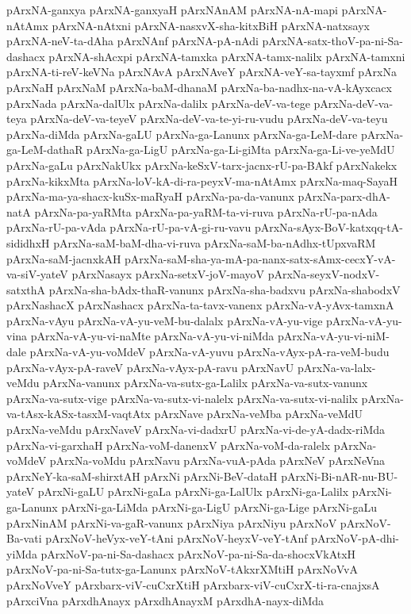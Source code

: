 {pArxNA-ganxya
pArxNA-ganxyaH
pArxNAnAM
pArxNA-nA-mapi
pArxNA-nAtAmx
pArxNA-nAtxni
pArxNA-nasxvX-sha-kitxBiH
pArxNA-natxsayx
pArxNA-neV-ta-dAha
pArxNAnf
pArxNA-pA-nAdi
pArxNA-satx-thoV-pa-ni-Sa-dashacx
pArxNA-shAcxpi
pArxNA-tamxka
pArxNA-tamx-nalilx
pArxNA-tamxni
pArxNA-ti-reV-keVNa
pArxNAvA
pArxNAveY
pArxNA-veY-sa-tayxmf
pArxNa
pArxNaH
pArxNaM
pArxNa-baM-dhanaM
pArxNa-ba-nadhx-na-vA-kAyxcacx
pArxNada
pArxNa-dalUlx
pArxNa-dalilx
pArxNa-deV-va-tege
pArxNa-deV-va-teya
pArxNa-deV-va-teyeV
pArxNa-deV-va-te-yi-ru-vudu
pArxNa-deV-va-teyu
pArxNa-diMda
pArxNa-gaLU
pArxNa-ga-Lanunx
pArxNa-ga-LeM-dare
pArxNa-ga-LeM-dathaR
pArxNa-ga-LigU
pArxNa-ga-Li-giMta
pArxNa-ga-Li-ve-yeMdU
pArxNa-gaLu
pArxNakUkx
pArxNa-keSxV-tarx-jacnx-rU-pa-BAkf
pArxNakekx
pArxNa-kikxMta
pArxNa-loV-kA-di-ra-peyxV-ma-nAtAmx
pArxNa-maq-SayaH
pArxNa-ma-ya-shacx-kuSx-maRyaH
pArxNa-pa-da-vanunx
pArxNa-parx-dhA-natA
pArxNa-pa-yaRMta
pArxNa-pa-yaRM-ta-vi-ruva
pArxNa-rU-pa-nAda
pArxNa-rU-pa-vAda
pArxNa-rU-pa-vA-gi-ru-vavu
pArxNa-sAyx-BoV-katxqq-tA-sididhxH
pArxNa-saM-baM-dha-vi-ruva
pArxNa-saM-ba-nAdhx-tUpxvaRM
pArxNa-saM-jacnxkAH
pArxNa-saM-sha-ya-mA-pa-nanx-satx-sAmx-cecxY-vA-va-siV-yateV
pArxNasayx
pArxNa-setxV-joV-mayoV
pArxNa-seyxV-nodxV-satxthA
pArxNa-sha-bAdx-thaR-vanunx
pArxNa-sha-badxvu
pArxNa-shabodxV
pArxNashacX
pArxNashacx
pArxNa-ta-tavx-vanenx
pArxNa-vA-yAvx-tamxnA
pArxNa-vAyu
pArxNa-vA-yu-veM-bu-dalalx
pArxNa-vA-yu-vige
pArxNa-vA-yu-vina
pArxNa-vA-yu-vi-naMte
pArxNa-vA-yu-vi-niMda
pArxNa-vA-yu-vi-niM-dale
pArxNa-vA-yu-voMdeV
pArxNa-vA-yuvu
pArxNa-vAyx-pA-ra-veM-budu
pArxNa-vAyx-pA-raveV
pArxNa-vAyx-pA-ravu
pArxNavU
pArxNa-va-lalx-veMdu
pArxNa-vanunx
pArxNa-va-sutx-ga-Lalilx
pArxNa-va-sutx-vanunx
pArxNa-va-sutx-vige
pArxNa-va-sutx-vi-nalelx
pArxNa-va-sutx-vi-nalilx
pArxNa-va-tAsx-kASx-tasxM-vaqtAtx
pArxNave
pArxNa-veMba
pArxNa-veMdU
pArxNa-veMdu
pArxNaveV
pArxNa-vi-dadxrU
pArxNa-vi-de-yA-dadx-riMda
pArxNa-vi-garxhaH
pArxNa-voM-danenxV
pArxNa-voM-da-ralelx
pArxNa-voMdeV
pArxNa-voMdu
pArxNavu
pArxNa-vuA-pAda
pArxNeV
pArxNeVna
pArxNeY-ka-saM-shirxtAH
pArxNi
pArxNi-BeV-dataH
pArxNi-Bi-nAR-nu-BU-yateV
pArxNi-gaLU
pArxNi-gaLa
pArxNi-ga-LalUlx
pArxNi-ga-Lalilx
pArxNi-ga-Lanunx
pArxNi-ga-LiMda
pArxNi-ga-LigU
pArxNi-ga-Lige
pArxNi-gaLu
pArxNinAM
pArxNi-va-gaR-vanunx
pArxNiya
pArxNiyu
pArxNoV
pArxNoV-Ba-vati
pArxNoV-heVyx-veY-tAni
pArxNoV-heyxV-veY-tAnf
pArxNoV-pA-dhi-yiMda
pArxNoV-pa-ni-Sa-dashacx
pArxNoV-pa-ni-Sa-da-shocxVkAtxH
pArxNoV-pa-ni-Sa-tutx-ga-Lanunx
pArxNoV-tAkxrXMtiH
pArxNoVvA
pArxNoVveY
pArxbarx-viV-cuCxrXtiH
pArxbarx-viV-cuCxrX-ti-ra-cnajxsA
pArxciVna
pArxdhAnayx
pArxdhAnayxM
pArxdhA-nayx-diMda
}
